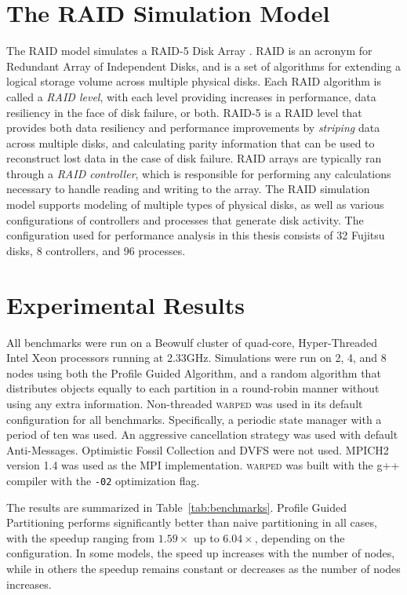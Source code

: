 \documentclass[11pt]{book}
\begin{document}
\section{The RAID Simulation Model}\label{raidDiscussion}

The RAID model simulates a RAID-5 Disk Array \cite{hennessy-12}. RAID is an acronym for Redundant Array of Independent Disks, and is a set of algorithms for extending a logical storage volume across multiple physical disks. Each RAID algorithm is called a \emph{RAID level}, with each level providing increases in performance, data resiliency in the face of disk failure, or both. RAID-5 is a RAID level that provides both data resiliency and performance improvements by \emph{striping} data across multiple disks, and calculating parity information that can be used to reconstruct lost data in the case of disk failure. RAID arrays are typically ran through a \emph{RAID controller}, which is responsible for performing any calculations necessary to handle reading and writing to the array. The RAID simulation model supports modeling of multiple types of physical disks, as well as various configurations of controllers and processes that generate disk activity. The configuration used for performance analysis in this thesis consists of 32 Fujitsu disks, 8 controllers, and 96 processes.

\section{Experimental Results}

All benchmarks were run on a Beowulf cluster of quad-core, Hyper-Threaded Intel Xeon processors running at 2.33GHz. Simulations were run on 2, 4, and 8 nodes using both the Profile Guided Algorithm, and a random algorithm that distributes objects equally to each partition in a round-robin manner without using any extra information. Non-threaded \textsc{warped} was used in its default configuration for all benchmarks. Specifically, a periodic state manager with a period of ten was used. An aggressive cancellation strategy was used with default Anti-Messages. Optimistic Fossil Collection and DVFS were not used. MPICH2 version 1.4 was used as the MPI implementation. \textsc{warped} was built with the g++ compiler with the \texttt{-02} optimization flag.

The results are summarized in Table~\ref{tab:benchmarks}. Profile Guided Partitioning performs significantly better than naive partitioning in all cases, with the speedup ranging from \(1.59\times\) up to \(6.04\times\), depending on the configuration. In some models, the speed up increases with the number of nodes, while in others the speedup remains constant or decreases as the number of nodes increases.
\end{document}
